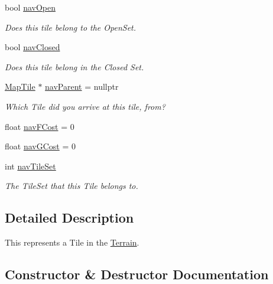 \begin{DoxyCompactItemize}
bool \mbox{\hyperlink{classpiolot_1_1_map_tile_ad26177f9ff510ea762454933534bcfd1}{nav\+Open}}
\begin{DoxyCompactList}\small\item\em Does this tile belong to the Open\+Set. \end{DoxyCompactList}\item 
bool \mbox{\hyperlink{classpiolot_1_1_map_tile_a272716e88eca5a971db3a3f9ea2ccf47}{nav\+Closed}}
\begin{DoxyCompactList}\small\item\em Does this tile belong in the Closed Set. \end{DoxyCompactList}\item 
\mbox{\hyperlink{classpiolot_1_1_map_tile}{Map\+Tile}} $\ast$ \mbox{\hyperlink{classpiolot_1_1_map_tile_aadab9080952f11ef7566b63b46a842a0}{nav\+Parent}} = nullptr
\begin{DoxyCompactList}\small\item\em Which Tile did you arrive at this tile, from? \end{DoxyCompactList}\item 
float \mbox{\hyperlink{classpiolot_1_1_map_tile_ac7792c3dfdb53cabaf7e444910067818}{nav\+F\+Cost}} = 0
\item 
float \mbox{\hyperlink{classpiolot_1_1_map_tile_a87c3aae25887660abd0cb4ee3ee9b973}{nav\+G\+Cost}} = 0
\item 
int \mbox{\hyperlink{classpiolot_1_1_map_tile_a1968deb3bc5f0c4ff4eb05995eff6fd7}{nav\+Tile\+Set}}
\begin{DoxyCompactList}\small\item\em The Tile\+Set that this Tile belongs to. \end{DoxyCompactList}\end{DoxyCompactItemize}


\subsection{Detailed Description}
This represents a Tile in the \mbox{\hyperlink{classpiolot_1_1_terrain}{Terrain}}. 

\subsection{Constructor \& Destructor Documentation}
\mbox{\label{classpiolot_1_1_map_tile_af673d44bd4ea54b760d423bdf4730194}} 
